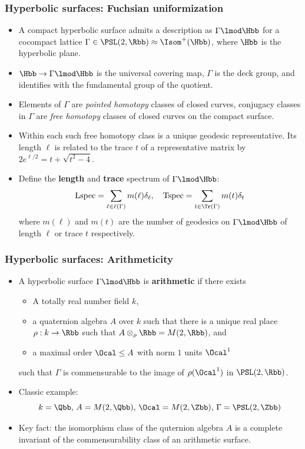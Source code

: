 \documentclass[10pt]{beamer}
\newcommand{\Lspec}{{\rm Lspec}}
\newcommand{\Tspec}{{\rm Tspec}}
\begin{document}
\begin{frame} \frametitle{Hyperbolic surfaces: Fuchsian uniformization}
	\begin{itemize}[<+->]
				\item  A compact hyperbolic surface admits a description as $\Gamma \lmod \Hbb$ for a 
				cocompact lattice $\Gamma \in \PSL(2,\Rbb) \approx \Isom^+ (\Hbb)$, where $\Hbb$ is the 
				hyperbolic plane. 
				\item $\Hbb \to \Gamma \lmod \Hbb $ is the universal covering map, $\Gamma$ is the deck 
				group,  and identifies with the fundamental group of the quotient.
				\item Elements of $\Gamma$ are \emph{pointed homotopy} classes of closed curves, 
				\pause 
				conjugacy classes in $\Gamma$ are  \emph{free homotopy} classes of closed curves on 
				the 
				compact surface. \pause
				\item Within each such free homotopy class is a unique geodesic representative.  \pause 
				Its length 
				$\ell$ is related to the trace $t$ of a representative matrix by $2e^{\ell/2} = t + \sqrt{t^2 
				-4}$. 
				\item Define the \textbf{length} and \textbf{trace} spectrum of $\Gamma \lmod \Hbb$: 
					\[ \Lspec =  \sum_{\ell \in \ell(\Gamma)}  m(\ell)\delta_\ell, \quad \Tspec = \sum _{t \in 
					\Tr(\Gamma)} m(t) 
					\delta_t  \] 
				\pause where $m(\ell)$ and $m(t)$ are the number of geodesics  on $\Gamma \lmod \Hbb$ 
				of 
				length $\ell$ or trace $t$ respectively. 
				
	\end{itemize}
\end{frame}%
\begin{frame} \frametitle{Hyperbolic surfaces: Arithmeticity}
 \begin{itemize}[<+->]
 	\item A hyperbolic surface $\Gamma \lmod \Hbb$ is \textbf{arithmetic} if there exists 
 	\begin{itemize}[<+->]
 		\item A totally real number field $k$,
 		\item a quaternion algebra $A$ over $k$ such that there is a unique real place $\rho: k \to \Rbb$ such that $A \otimes_\rho \Rbb = M(2,\Rbb)$, and
 		\item a maximal order $\Ocal \leq A$ with norm $1$ units $\Ocal^1$
 	\end{itemize}
 \pause such that $\Gamma$ is commensurable to the image of $\rho(\Ocal^1) $ in $ 
 \PSL(2,\Rbb)$. 
 \pause
 \item Classic example: 
			\[ k = \Qbb,\,  A = M(2,\Qbb),\, \Ocal = M(2,\Zbb), \, \Gamma = \PSL(2,\Zbb)  \]
 \item Key fact: the isomorphism class of the quternion algebra $A$ is a complete invariant of the commensurability class of an arithmetic surface. 
 \end{itemize}
\end{frame}%
\end{document}
